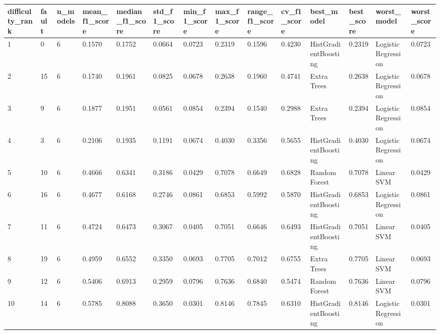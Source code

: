 \begin{tabular}{llllllllllllll}
\toprule
difficulty\_rank & fault & n\_models & mean\_f1\_score & median\_f1\_score & std\_f1\_score & min\_f1\_score & max\_f1\_score & range\_f1\_score & cv\_f1\_score & best\_model & best\_score & worst\_model & worst\_score \\
\midrule
1 & 0 & 6 & 0.1570 & 0.1752 & 0.0664 & 0.0723 & 0.2319 & 0.1596 & 0.4230 & HistGradientBoosting & 0.2319 & Logistic Regression & 0.0723 \\
2 & 15 & 6 & 0.1740 & 0.1961 & 0.0825 & 0.0678 & 0.2638 & 0.1960 & 0.4741 & Extra Trees & 0.2638 & Logistic Regression & 0.0678 \\
3 & 9 & 6 & 0.1877 & 0.1951 & 0.0561 & 0.0854 & 0.2394 & 0.1540 & 0.2988 & Extra Trees & 0.2394 & Logistic Regression & 0.0854 \\
4 & 3 & 6 & 0.2106 & 0.1935 & 0.1191 & 0.0674 & 0.4030 & 0.3356 & 0.5655 & HistGradientBoosting & 0.4030 & Logistic Regression & 0.0674 \\
5 & 10 & 6 & 0.4666 & 0.6341 & 0.3186 & 0.0429 & 0.7078 & 0.6649 & 0.6828 & Random Forest & 0.7078 & Linear SVM & 0.0429 \\
6 & 16 & 6 & 0.4677 & 0.6168 & 0.2746 & 0.0861 & 0.6853 & 0.5992 & 0.5870 & HistGradientBoosting & 0.6853 & Logistic Regression & 0.0861 \\
7 & 11 & 6 & 0.4724 & 0.6473 & 0.3067 & 0.0405 & 0.7051 & 0.6646 & 0.6493 & HistGradientBoosting & 0.7051 & Linear SVM & 0.0405 \\
8 & 19 & 6 & 0.4959 & 0.6552 & 0.3350 & 0.0693 & 0.7705 & 0.7012 & 0.6755 & Extra Trees & 0.7705 & Linear SVM & 0.0693 \\
9 & 12 & 6 & 0.5406 & 0.6913 & 0.2959 & 0.0796 & 0.7636 & 0.6840 & 0.5474 & Random Forest & 0.7636 & Linear SVM & 0.0796 \\
10 & 14 & 6 & 0.5785 & 0.8088 & 0.3650 & 0.0301 & 0.8146 & 0.7845 & 0.6310 & HistGradientBoosting & 0.8146 & Logistic Regression & 0.0301 \\
\bottomrule
\end{tabular}
